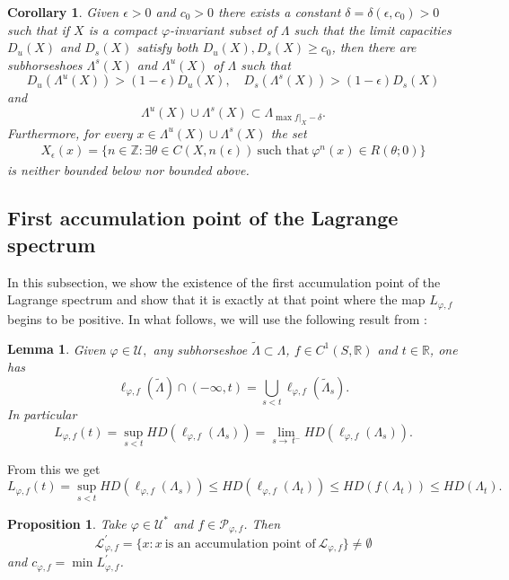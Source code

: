 \documentclass[12pt]{amsart}
\theoremstyle{plain} %
\newtheorem{proposition}[theorem]{Proposition}
\newtheorem{lemma}[theorem]{Lemma}
\newtheorem{corollary}[theorem]{Corollary}
\theoremstyle{definition} %
\numberwithin{equation}{section}
\begin{document}
\begin{corollary}\label{uniform}
Given $\epsilon >0$ and $c_0 >0$ there exists a constant $\delta=\delta(\epsilon, c_0)>0$ such that if $X$ is a compact $\varphi$-invariant subset of $\Lambda$ such that the limit capacities $D_u(X)$ and $D_s(X)$ satisfy both $D_u(X), D_s(X) \geq c_0$, then there are subhorseshoes $\Lambda ^s(X)$ and  $\Lambda ^u(X)$ of $\Lambda$ such that 
$$D_u(\Lambda ^u(X))>(1-\epsilon)D_u(X), \quad D_s(\Lambda ^s(X))>(1-\epsilon)D_s(X)$$ 
and 
  $$\Lambda ^u(X)\cup \Lambda ^s(X) \subset \Lambda_{\max f|_X-\delta}.$$ 
Furthermore, for every $x\in \Lambda ^u(X) \cup \Lambda ^s(X)$ the set
\begin{eqnarray*}
X_\epsilon(x)=\{n\in \mathbb{Z}: \exists \theta\in C(X,n(\epsilon))\ \mbox{such that}\ \varphi^n(x)\in R(\theta;0)\}
\end{eqnarray*} 
is neither bounded below nor bounded above.
\end{corollary}

\subsection{First accumulation point of the Lagrange spectrum}
In this subsection, we show the existence of the first accumulation point of the Lagrange spectrum and show that it is exactly at that point where the map $L_{\varphi, f}$ begins to be positive. In what follows, we will use the following result from \cite{GCD}:

\begin{lemma}\label{L1}
Given $\varphi\in \mathcal{U},$ any subhorseshoe $\tilde{\Lambda}\subset \Lambda$, $f\in C^1(S,\mathbb{R})$ and $t\in\mathbb{R}$, one has
$$\ell_{\varphi,f}(\tilde{\Lambda})\cap (-\infty,t)= \bigcup \limits_{s<t} \ell_{\varphi,f}(\tilde{\Lambda}_s).$$
In particular
$$L_{\varphi, f}(t)=\sup \limits_{s <t} HD(\ell_{\varphi,f}(\Lambda_s))=\lim \limits_{s \to\ t^-} HD(\ell_{\varphi,f}(\Lambda_s)).$$
\end{lemma}
From this we get 
\begin{equation}\label{L}
    L_{\varphi, f}(t)=\sup \limits_{s <t} HD(\ell_{\varphi,f}(\Lambda_s)) \leq HD(\ell_{\varphi,f}(\Lambda_{t})) \leq HD(f(\Lambda_{t}))\leq HD(\Lambda_{t}).
\end{equation}

 \begin{proposition}\label{first}
    Take $\varphi \in \mathcal{U}^*$ and $f\in \mathcal{P}_{\varphi,f}$. Then 
     $$\mathcal{L}^{'} _{\varphi, f}=\{x: x\ \textrm{is an accumulation point of}\ \mathcal{L}_{\varphi, f}\}\neq \emptyset$$ and $c_{\varphi,f}=\min L^{'} _{\varphi, f}$.
 \end{proposition}
\end{document}
